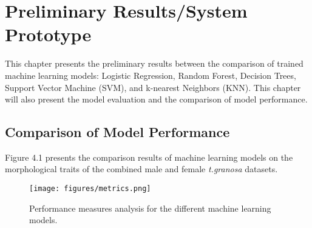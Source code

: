 \chapter{Preliminary Results/System Prototype}
This chapter presents the preliminary results between the comparison of trained machine learning models: Logistic Regression, Random Forest,  Decision Trees, Support Vector Machine (SVM), and k-nearest Neighbors (KNN).  This chapter will also present the model evaluation and the comparison of model performance. 

\section{Comparison of Model Performance}
Figure 4.1 presents the comparison results of machine learning models on the morphological traits of the combined  male and female \textit{t.granosa} datasets.

\begin{figure}[htbp]
	\centering
	\texttt{[image: figures/metrics.png]}
	\caption{Performance measures analysis for the different machine learning models.}
\end{figure}